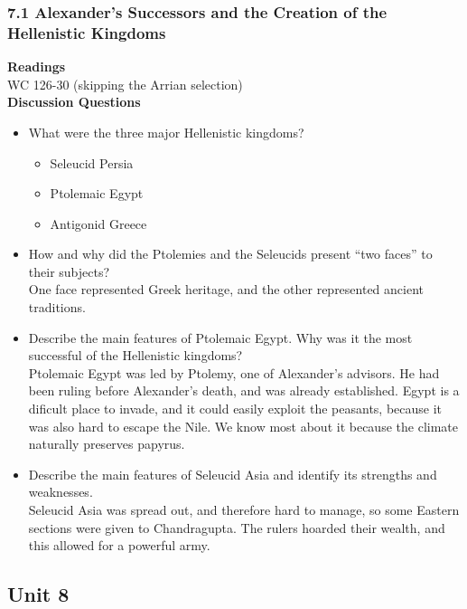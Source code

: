 \documentclass{article}
\begin{document}
\subsubsection*{7.1 Alexander’s Successors and the Creation of the Hellenistic Kingdoms}
\textbf{Readings} \\
WC 126-30 (skipping the Arrian selection) \\
\textbf{Discussion Questions}
\begin{itemize}
  \item What were the three major Hellenistic kingdoms?
  \begin{itemize}
    \item Seleucid Persia
    \item Ptolemaic Egypt
    \item Antigonid Greece
  \end{itemize}
  \item How and why did the Ptolemies and the Seleucids present “two faces” to their
  subjects? \\
  One face represented Greek heritage, and the other represented ancient traditions.
  \item Describe the main features of Ptolemaic Egypt. Why was it the most successful of
  the Hellenistic kingdoms? \\
  Ptolemaic Egypt was led by Ptolemy, one of Alexander's advisors. He had been ruling before
  Alexander's death, and was already established. Egypt is a dificult place to invade, and
  it could easily exploit the peasants, because it was also hard to escape the Nile. We know
  most about it because the climate naturally preserves papyrus.
  \item Describe the main features of Seleucid Asia and identify its strengths and
  weaknesses. \\
  Seleucid Asia was spread out, and therefore hard to manage, so some Eastern sections
  were given to Chandragupta. The rulers hoarded their wealth, and this allowed for a
  powerful army.
\end{itemize}
\subsection*{Unit 8}
\end{document}
